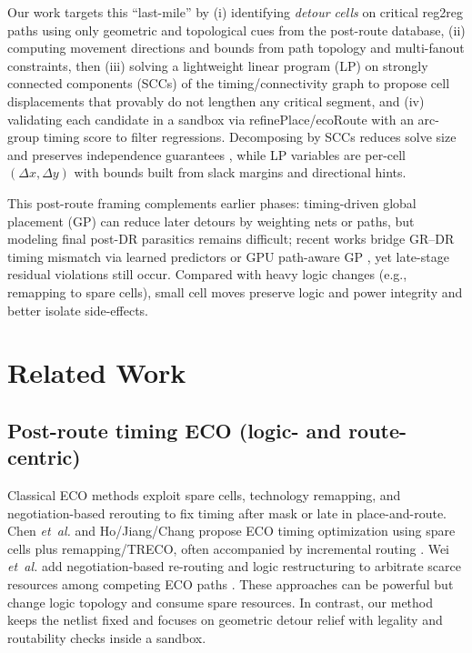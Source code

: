 Our work targets this ``last-mile'' by (i) identifying \emph{detour cells} on critical reg2reg paths using only geometric and topological cues from the post-route database, (ii) computing movement directions and bounds from path topology and multi-fanout constraints, then (iii) solving a lightweight linear program (LP) on strongly connected components (SCCs) of the timing/connectivity graph to propose cell displacements that provably do not lengthen any critical segment, and (iv) validating each candidate in a sandbox via refinePlace/ecoRoute with an arc-group timing score to filter regressions. Decomposing by SCCs reduces solve size and preserves independence guarantees \cite{Tarjan72}, while LP variables are per-cell $(\Delta x,\Delta y)$ with bounds built from slack margins and directional hints.

This post-route framing complements earlier phases: timing-driven global placement (GP) can reduce later detours by weighting nets or paths, but modeling final post-DR parasitics remains difficult; recent works bridge GR–DR timing mismatch via learned predictors \cite{Chhabria-ML-RouteConsistency23} or GPU path-aware GP \cite{Shi-TDPlace-2025}, yet late-stage residual violations still occur. Compared with heavy logic changes (e.g., remapping to spare cells), small cell moves preserve logic and power integrity and better isolate side-effects.

\section{Related Work}
\subsection{Post-route timing ECO (logic- and route-centric)}
Classical ECO methods exploit spare cells, technology remapping, and negotiation-based rerouting to fix timing after mask or late in place-and-route. Chen \emph{et~al.} and Ho/Jiang/Chang propose ECO timing optimization using spare cells plus remapping/TRECO, often accompanied by incremental routing \cite{Chen-TCAD10,Ho-ASP-DAC10,Chang-DAC12,Chang-TCAD13}. Wei \emph{et~al.} add negotiation-based re-routing and logic restructuring to arbitrate scarce resources among competing ECO paths \cite{Wei-ASP-DAC12}. These approaches can be powerful but change logic topology and consume spare resources. In contrast, our method keeps the netlist fixed and focuses on geometric detour relief with legality and routability checks inside a sandbox.

